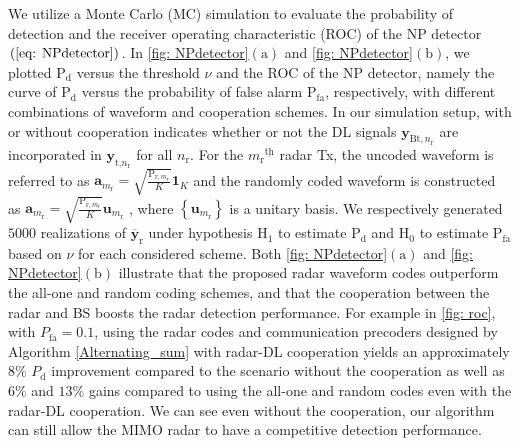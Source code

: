 \documentclass[9pt,journal]{IEEEtran}
\newcommand{\paren}[1]{\left({#1}\right)}
\newcommand{\braces}[1]{{\left\{ {#1}\right\}}}
\newcommand{\ith}[1]    {{#1}^{\underline{\text{th}}}}
\newcommand{\rr}{_\mathrm{r}}
\begin{document}
We utilize a Monte Carlo (MC) simulation to evaluate the probability of detection  and the receiver operating characteristic (ROC) of the NP detector $\paren{\ref{eq: NPdetector}}$\cite{Kay1993detection}. In \figurename{\;\ref{fig: NPdetector}$\paren{\mathrm{a}}$} and \figurename{\;\ref{fig: NPdetector}$\paren{\mathrm{b}}$}, we plotted $\mathrm{P}_{\textrm{d}}$ versus the threshold $\nu$ and the ROC of the NP detector, namely the curve of $\mathrm{P}_{\textrm{d}}$ versus the probability of false alarm $\mathrm{P}_{\textrm{fa}}$, respectively, with different combinations of waveform and cooperation schemes. In our simulation setup, with or without cooperation indicates whether or not the DL signals $\mathbf{y}_{\textrm{Bt},n\rr}$ are incorporated in $\mathbf{y}_{\textrm{t,}n\rr}$ for all $n\rr$. For the $\ith{m\rr}$ radar Tx, the uncoded waveform is referred to as $\mathbf{a}_{m\rr}=\sqrt{\frac{\mathrm{P}_{\textrm{r},m\rr}}{\mathit{K}}}\mathbf{1}_{\mathit{K}}$ and the randomly coded waveform is constructed as $\mathbf{a}_{m\rr}=\sqrt{\frac{\mathrm{P}_{\textrm{r},m\rr}}{\mathit{K}}}\mathbf{u}_{m\rr}$ , where $\braces{\mathbf{u}_{m\rr}}$ is a unitary basis. We respectively generated $5000$ realizations of $\overline{\mathbf{y}}_{\textrm{r}}$ under hypothesis $\mathrm{H}_1$ to estimate $\mathrm{P}_{\textrm{d}}$ and $\mathrm{H}_0$ to estimate $\mathrm{P}_{\textrm{fa}}$ based on $\nu$ for each considered scheme. Both \figurename{\;\ref{fig: NPdetector}$\paren{\mathrm{a}}$} and \figurename{\;\ref{fig: NPdetector}$\paren{\mathrm{b}}$} illustrate that the proposed radar waveform codes outperform the all-one and random coding schemes, and that the cooperation between the radar and BS boosts the radar detection performance. For example in \figurename{\ref{fig: roc}}, with $P_{\textrm{fa}}=0.1$, using the radar codes and communication precoders designed by Algorithm \ref{Alternating_sum} with radar-DL cooperation yields an approximately $8\%$ $P_{\textrm{d}}$ improvement compared to the scenario without the cooperation as well as  $6\%$ and $13\%$ gains compared to using the all-one and random codes even with the radar-DL cooperation. We can see even without the cooperation, our algorithm can still allow the MIMO radar to have a competitive detection performance.

\vspace{-1em}
\end{document}
